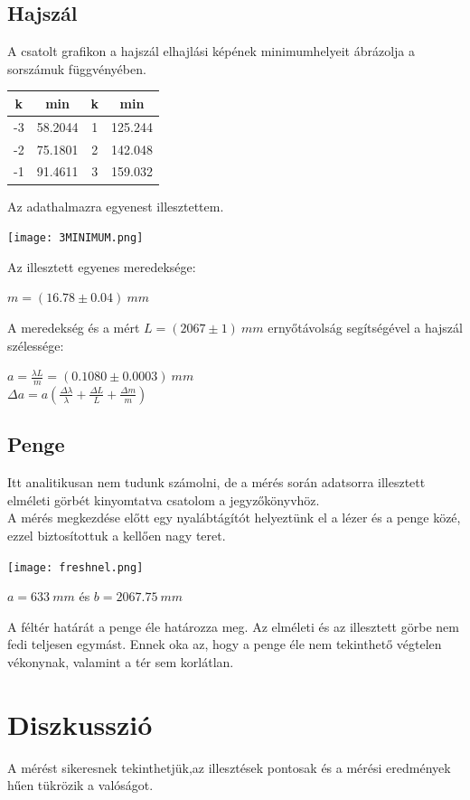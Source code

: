 \documentclass[a4paper,11pt]{article}
\begin{document}
\subsection{Hajszál}
A csatolt grafikon a hajszál elhajlási képének minimumhelyeit ábrázolja a sorszámuk függvényében.
\begin{center}
\begin{tabular}{|c|c|c|c|} \hline
k & min & k & min \\ \hline
-3 & 58.2044 & 1 & 125.244 \\ \hline
-2 & 75.1801 & 2 & 142.048 \\ \hline
-1 & 91.4611 & 3 & 159.032 \\ \hline
\end{tabular}
\end{center}
Az adathalmazra egyenest illesztettem.
\begin{center}
\texttt{[image: 3MINIMUM.png]}
\end{center}
Az illesztett egyenes meredeksége:
\begin{center}
$m=(16.78\pm0.04)~mm$
\end{center}
A meredekség és a mért $L=(2067\pm1)~mm$ ernyőtávolság segítségével a hajszál szélessége:
\begin{center}
$a=\frac{\lambda L}{m}=(0.1080\pm0.0003)~mm$
\\
$\Delta a=a(\frac{\Delta \lambda}{\lambda}+\frac{\Delta L}{L}+\frac{\Delta m}{m})$
\end{center}

\subsection{Penge}
Itt analitikusan nem tudunk számolni, de a mérés során adatsorra illesztett elméleti görbét kinyomtatva csatolom a jegyzőkönyvhöz. \\
A mérés megkezdése előtt egy nyalábtágítót helyeztünk el a lézer és a penge közé, ezzel biztosítottuk a kellően nagy teret. 
\begin{center}
\texttt{[image: freshnel.png]}
\end{center}
\begin{center}
$a=633~mm$ és $b=2067.75~mm$
\end{center}
A féltér határát a penge éle határozza meg. Az elméleti és az illesztett görbe nem fedi teljesen egymást. Ennek oka az, hogy a penge éle nem tekinthető végtelen vékonynak, valamint a tér sem korlátlan.

\section{Diszkusszió}
A mérést sikeresnek tekinthetjük,az illesztések pontosak és a mérési eredmények hűen tükrözik a valóságot.
\end{document}
